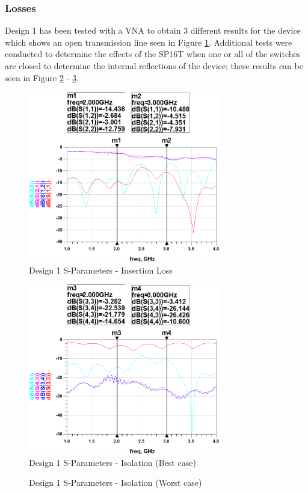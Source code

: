 \documentclass[12pt,openany,a4paper]{book}
\begin{document}
\subsubsection{Losses}
Design 1 has been tested with a VNA to obtain $3$ different results for the device which shows an open transmission line seen in Figure \ref{fig:design1_1}. Additional tests were conducted to determine the effects of the SP16T when one or all of the switches are closed to determine the internal reflections of the device; these results can be seen in Figure \ref{fig:design1_2} - \ref{fig:design1_3}.

\begin{figure}[H]
	\centering
	\includegraphics[width=0.75\textwidth]{Design1-1.png}
	\caption{Design 1 S-Parameters - Insertion Loss}
	\label{fig:design1_1}
\end{figure} 
\begin{figure}[H]
	\centering
	\includegraphics[width=0.75\textwidth]{Design1-2.png}
	\caption{Design 1 S-Parameters - Isolation (Best case)}
	\label{fig:design1_2}
\end{figure} 
\begin{figure}[H]
	\centering
	\caption{Design 1 S-Parameters - Isolation (Worst case)}
	\label{fig:design1_3}
\end{figure} 
\end{document}

